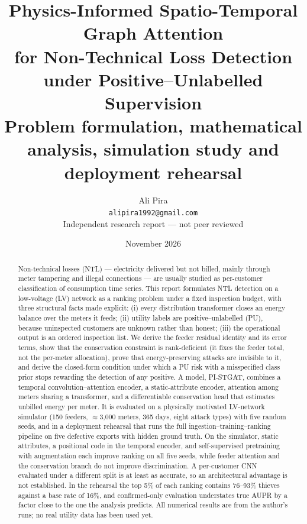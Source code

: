 \documentclass[11pt,a4paper]{article}
\title{\textbf{Physics-Informed Spatio-Temporal Graph Attention\\for Non-Technical Loss Detection under Positive--Unlabelled Supervision}\\[0.4em]
\large Problem formulation, mathematical analysis, simulation study and deployment rehearsal}
\author{Ali Pira \\ \small\texttt{alipira1992@gmail.com} \\ \small Independent research report --- not peer reviewed}
\date{November 2026}
\theoremstyle{plain}
\theoremstyle{definition}
\theoremstyle{remark}
\begin{document}
\maketitle

\begin{abstract}
\noindent Non-technical losses (NTL) --- electricity delivered but not billed, mainly through meter tampering and illegal connections --- are usually studied as per-customer classification of consumption time series. This report formulates NTL detection on a low-voltage (LV) network as a ranking problem under a fixed inspection budget, with three structural facts made explicit: (i) every distribution transformer closes an energy balance over the meters it feeds; (ii) utility labels are positive--unlabelled (PU), because uninspected customers are unknown rather than honest; (iii) the operational output is an ordered inspection list. We derive the feeder residual identity and its error terms, show that the conservation constraint is rank-deficient (it fixes the feeder total, not the per-meter allocation), prove that energy-preserving attacks are invisible to it, and derive the closed-form condition under which a PU risk with a misspecified class prior stops rewarding the detection of any positive. A model, PI-STGAT, combines a temporal convolution--attention encoder, a static-attribute encoder, attention among meters sharing a transformer, and a differentiable conservation head that estimates unbilled energy per meter. It is evaluated on a physically motivated LV-network simulator (150 feeders, $\approx$3{,}000 meters, 365 days, eight attack types) with five random seeds, and in a deployment rehearsal that runs the full ingestion--training--ranking pipeline on five defective exports with hidden ground truth. On the simulator, static attributes, a positional code in the temporal encoder, and self-supervised pretraining with augmentation each improve ranking on all five seeds, while feeder attention and the conservation branch do not improve discrimination. A per-customer CNN evaluated under a different split is at least as accurate, so an architectural advantage is not established. In the rehearsal the top 5\% of each ranking contains 76--93\% thieves against a base rate of 16\%, and confirmed-only evaluation understates true AUPR by a factor close to the one the analysis predicts. All numerical results are from the author's runs; no real utility data has been used yet.
\end{abstract}
\end{document}
